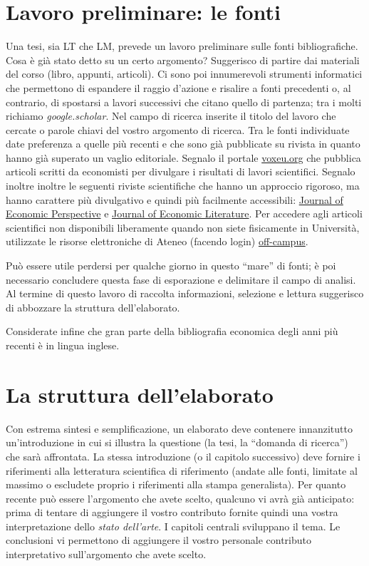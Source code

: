 \documentclass[12pt]{article}
\begin{document}
\section{Lavoro preliminare: le fonti}\label{sec:fonti}
Una tesi, sia LT che LM, prevede un lavoro preliminare sulle fonti
bibliografiche. Cosa \`e gi\`a stato detto su un certo argomento?
Suggerisco di partire dai materiali del corso (libro, appunti,
articoli). Ci sono poi innumerevoli strumenti informatici che
permettono di espandere il raggio d'azione e risalire a fonti
precedenti o, al contrario, di spostarsi a lavori successivi che
citano quello di partenza; tra i molti richiamo
\textit{google.scholar}. Nel campo di ricerca inserite il titolo del
lavoro che cercate o parole chiavi del vostro argomento di
ricerca. Tra le fonti individuate date preferenza a quelle pi\`u
recenti e che sono gi\`a pubblicate su rivista in quanto hanno gi\`a
superato un vaglio editoriale. Segnalo il portale
\href{https://voxeu.org/}{voxeu.org} che pubblica articoli scritti da
economisti per divulgare i risultati di lavori scientifici. Segnalo
inoltre inoltre le seguenti riviste scientifiche che hanno un
approccio rigoroso, ma hanno carattere pi\`u divulgativo e quindi
pi\`u facilmente accessibili:
\href{https://www.aeaweb.org/journals/jep}{Journal of Economic
  Perspective} e \href{https://www.aeaweb.org/journals/jel}{Journal of
  Economic Literature}. Per accedere agli articoli scientifici non
disponibili liberamente quando non siete fisicamente in Universit\`a,
utilizzate le risorse elettroniche di Ateneo (facendo login)
\href{https://www.unicatt.it/off-campus}{off-campus}.

Pu\`o essere utile perdersi per qualche giorno in questo ``mare'' di
fonti; \`e poi necessario concludere questa fase di esporazione e
delimitare il campo di analisi. Al termine di questo lavoro di
raccolta informazioni, selezione e lettura suggerisco di abbozzare la
struttura dell'elaborato.

Considerate infine che gran parte della bibliografia economica degli
anni pi\`u recenti \`e in lingua inglese.



\section{La struttura dell'elaborato}
Con estrema sintesi e semplificazione, un elaborato deve contenere
innanzitutto un'introduzione in cui si illustra la questione (la tesi,
la ``domanda di ricerca'') che sar\`a affrontata. La stessa
introduzione (o il capitolo successivo) deve fornire i riferimenti
alla letteratura scientifica di riferimento (andate alle fonti,
limitate al massimo o escludete proprio i riferimenti alla stampa
generalista). Per quanto recente pu\`o essere l'argomento che avete
scelto, qualcuno vi avr\`a gi\`a anticipato: prima di tentare di
aggiungere il vostro contributo fornite quindi una vostra
interpretazione dello \textit{stato dell'arte}.  I capitoli centrali
sviluppano il tema. Le conclusioni vi permettono di aggiungere il
vostro personale contributo interpretativo sull'argomento che avete
scelto.
\end{document}

